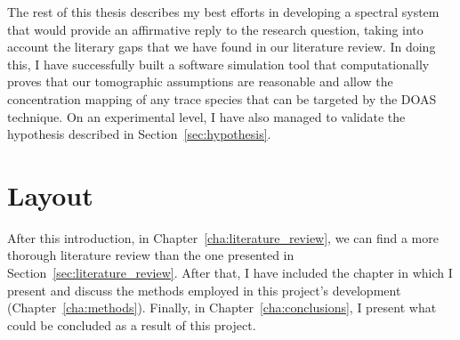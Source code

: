 The rest of this thesis describes my best efforts in developing a
spectral system that would provide an affirmative reply to the research
question, taking into account the literary gaps that we have found in
our literature review. In doing this, I have successfully built a
software simulation tool that computationally proves that our
tomographic assumptions are reasonable and allow the concentration
mapping of any trace species that can be targeted by the \gls{DOAS}
technique. On an experimental level, I have also managed to validate the
hypothesis described in Section~\ref{sec:hypothesis}.

\section{Layout}%
\label{sec:layout}

After this introduction, in Chapter~\ref{cha:literature_review}, we can
find a more thorough literature review than the one presented in
Section~\ref{sec:literature_review}. After that, I have included the
chapter in which I present and discuss the methods employed in this
project's development (Chapter~\ref{cha:methods}). Finally, in
Chapter~\ref{cha:conclusions}, I present what could be concluded as a
result of this project.

















